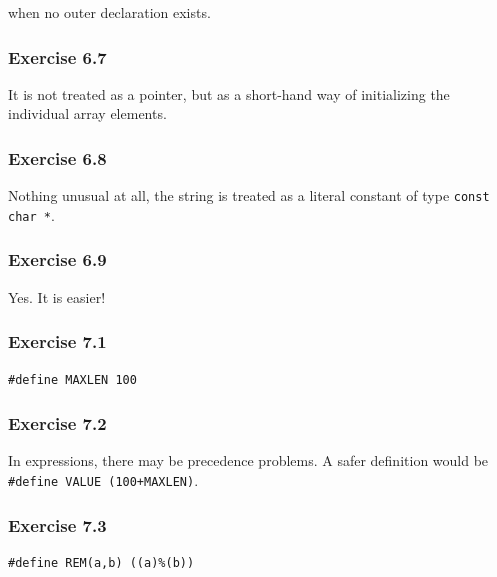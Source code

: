    when no outer declaration exists.


  

  \subsubsection*{Exercise 6.7}

   It is not treated as a pointer, but as a short-hand way of initializing
    the individual array elements.


  

  \subsubsection*{Exercise 6.8}

   Nothing unusual at all, the string is treated as a literal constant of
    type \texttt{const char *}.


  

  \subsubsection*{Exercise 6.9}

   Yes. It is easier!


  

 

  

  \subsubsection*{Exercise 7.1}

   \begin{Verbatim}
#define MAXLEN 100
\end{Verbatim}

  

  \subsubsection*{Exercise 7.2}

   In expressions, there may be precedence problems. A safer definition
    would be \texttt{\#define VALUE (100+MAXLEN)}.


  

  \subsubsection*{Exercise 7.3}

   \begin{Verbatim}
#define REM(a,b) ((a)%(b))
\end{Verbatim}

